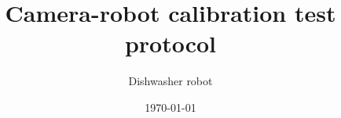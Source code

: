 \documentclass{article}
\begin{document}

\author{Dishwasher robot} %
\date{\today}

\title{Camera-robot calibration test protocol}

\begin{Form}

\maketitle



\newpage



\end{Form}
\end{document}
